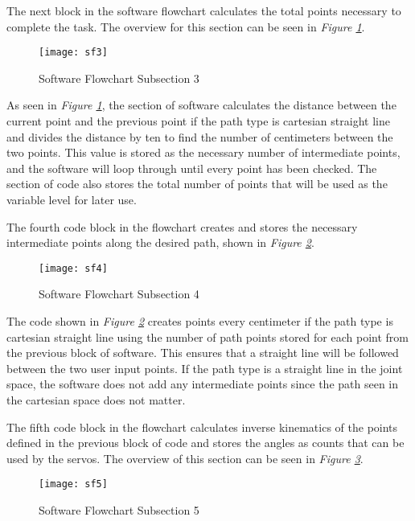 The next block in the software flowchart calculates the total points necessary to complete the task. The overview for this section can be seen in \emph{Figure \ref{fig:sf3}}.

\begin{figure}[htp]
  \center
  \texttt{[image: sf3]}
  \caption[]{Software Flowchart Subsection 3}
  \label{fig:sf3}
\end{figure}

As seen in \emph{Figure \ref{fig:sf3}}, the section of software calculates the distance between the current point and the previous point if the path type is cartesian straight line and divides the distance by ten to find the number of centimeters between the two points. This value is stored as the necessary number of intermediate points, and the software will loop through until every point has been checked. The section of code also stores the total number of points that will be used as the variable level for later use.

The fourth code block in the flowchart creates and stores the necessary intermediate points along the desired path, shown in \emph{Figure \ref{fig:sf4}}.

\begin{figure}[htp]
  \center
  \texttt{[image: sf4]}
  \caption[]{Software Flowchart Subsection 4}
  \label{fig:sf4}
\end{figure}

The code shown in \emph{Figure \ref{fig:sf4}} creates points every centimeter if the path type is cartesian straight line using the number of path points stored for each point from the previous block of software. This ensures that a straight line will be followed between the two user input points. If the path type is a straight line in the joint space, the software does not add any intermediate points since the path seen in the cartesian space does not matter.

The fifth code block in the flowchart calculates inverse kinematics of the points defined in the previous block of code and stores the angles as counts that can be used by the servos. The overview of this section can be seen in \emph{Figure \ref{fig:sf5}}.

\begin{figure}[htp]
  \center
  \texttt{[image: sf5]}
  \caption[]{Software Flowchart Subsection 5}
  \label{fig:sf5}
\end{figure}

